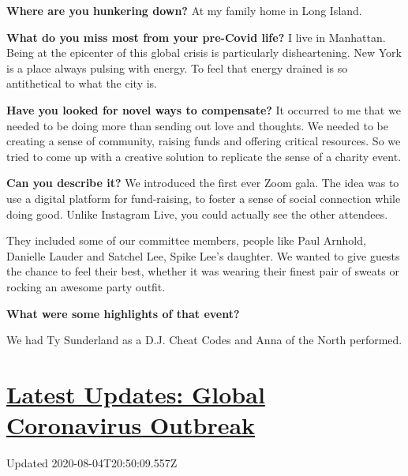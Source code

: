 \textbf{Where are you hunkering down?} At my family home in Long Island.

\textbf{What do you miss most from your pre-Covid life?} I live in
Manhattan. Being at the epicenter of this global crisis is particularly
disheartening. New York is a place always pulsing with energy. To feel
that energy drained is so antithetical to what the city is.

\textbf{Have you looked for novel ways to compensate?} It occurred to me
that we needed to be doing more than sending out love and thoughts. We
needed to be creating a sense of community, raising funds and offering
critical resources. So we tried to come up with a creative solution to
replicate the sense of a charity event.

\textbf{Can you describe it?} We introduced the first ever Zoom gala.
The idea was to use a digital platform for fund-raising, to foster a
sense of social connection while doing good. Unlike Instagram Live, you
could actually see the other attendees.

They included some of our committee members, people like Paul Arnhold,
Danielle Lauder and Satchel Lee, Spike Lee's daughter. We wanted to give
guests the chance to feel their best, whether it was wearing their
finest pair of sweats or rocking an awesome party outfit.

\textbf{What were some highlights of that event?}

We had Ty Sunderland as a D.J. Cheat Codes and Anna of the North
performed.

\hypertarget{latest-updates-global-coronavirus-outbreak}{%
\section{\texorpdfstring{\href{https://www.nytimes3xbfgragh.onion/2020/08/04/world/coronavirus-cases.html?action=click\&pgtype=Article\&state=default\&region=MAIN_CONTENT_1\&context=storylines_live_updates}{Latest
Updates: Global Coronavirus
Outbreak}}{Latest Updates: Global Coronavirus Outbreak}}\label{latest-updates-global-coronavirus-outbreak}}

Updated 2020-08-04T20:50:09.557Z

